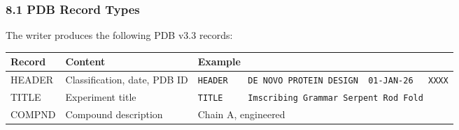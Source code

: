 \hypertarget{pdb-record-types}{%
\subsubsection{8.1 PDB Record Types}\label{pdb-record-types}}

The writer produces the following PDB v3.3 records:

\begin{longtable}[]{@{}lll@{}}
\toprule
\begin{minipage}[b]{0.28\columnwidth}\raggedright
Record\strut
\end{minipage} & \begin{minipage}[b]{0.32\columnwidth}\raggedright
Content\strut
\end{minipage} & \begin{minipage}[b]{0.32\columnwidth}\raggedright
Example\strut
\end{minipage}\tabularnewline
\midrule
\endhead
\begin{minipage}[t]{0.28\columnwidth}\raggedright
HEADER\strut
\end{minipage} & \begin{minipage}[t]{0.32\columnwidth}\raggedright
Classification, date, PDB ID\strut
\end{minipage} & \begin{minipage}[t]{0.32\columnwidth}\raggedright
\texttt{HEADER\ \ \ \ DE\ NOVO\ PROTEIN\ DESIGN\ \ 01-JAN-26\ \ \ XXXX}\strut
\end{minipage}\tabularnewline
\begin{minipage}[t]{0.28\columnwidth}\raggedright
TITLE\strut
\end{minipage} & \begin{minipage}[t]{0.32\columnwidth}\raggedright
Experiment title\strut
\end{minipage} & \begin{minipage}[t]{0.32\columnwidth}\raggedright
\texttt{TITLE\ \ \ \ \ Imscribing\ Grammar\ Serpent\ Rod\ Fold}\strut
\end{minipage}\tabularnewline
\begin{minipage}[t]{0.28\columnwidth}\raggedright
COMPND\strut
\end{minipage} & \begin{minipage}[t]{0.32\columnwidth}\raggedright
Compound description\strut
\end{minipage} & \begin{minipage}[t]{0.32\columnwidth}\raggedright
Chain A, engineered\strut
\end{minipage}\tabularnewline

\end{longtable}
